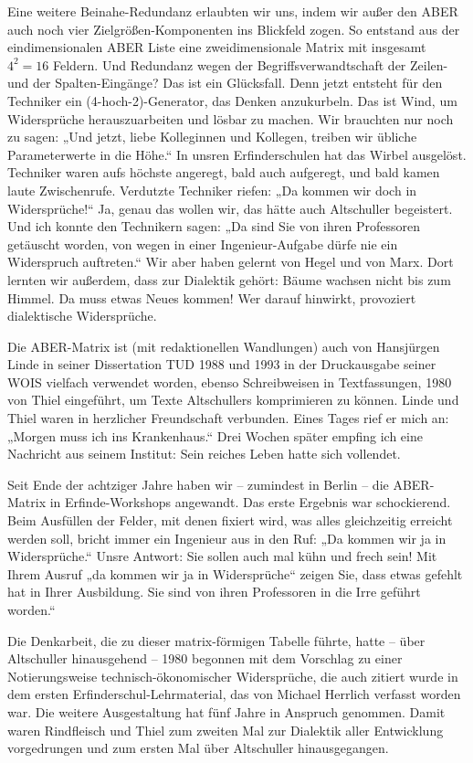 \documentclass[12pt,a4paper]{article}
\begin{document}
Eine weitere Beinahe-Redundanz erlaubten wir uns, indem wir außer den ABER auch
noch vier Zielgrößen-Komponenten ins Blickfeld zogen. So entstand aus der
eindimensionalen ABER Liste eine zweidimensionale Matrix mit insgesamt $4^2=16$
Feldern. Und Redundanz wegen der Begriffsverwandtschaft der Zeilen- und der
Spalten-Eingänge? Das ist ein Glücksfall. Denn jetzt entsteht für den Techniker
ein (4-hoch-2)-Generator, das Denken anzukurbeln. Das ist Wind, um Widersprüche
herauszuarbeiten und lösbar zu machen. Wir brauchten nur noch zu sagen: „Und
jetzt, liebe Kolleginnen und Kollegen, treiben wir übliche Parameterwerte in
die Höhe.“ In unsren Erfinderschulen hat das Wirbel ausgelöst. Techniker waren
aufs höchste angeregt, bald auch aufgeregt, und bald kamen laute Zwischenrufe.
Verdutzte Techniker riefen: „Da kommen wir doch in Widersprüche!“ Ja, genau das
wollen wir, das hätte auch Altschuller begeistert. Und ich konnte den
Technikern sagen: „Da sind Sie von ihren Professoren getäuscht worden, von
wegen in einer Ingenieur-Aufgabe dürfe nie ein Widerspruch auftreten.“ Wir aber
haben gelernt von Hegel und von Marx. Dort lernten wir außerdem, dass zur
Dialektik gehört: Bäume wachsen nicht bis zum Himmel. Da muss etwas Neues
kommen! Wer darauf hinwirkt, provoziert dialektische Widersprüche.

Die ABER-Matrix ist (mit redaktionellen Wandlungen) auch von Hansjürgen Linde
in seiner Dissertation TUD 1988 und 1993 in der Druckausgabe seiner WOIS
vielfach verwendet worden, ebenso Schreibweisen in Textfassungen, 1980 von
Thiel eingeführt, um Texte Altschullers komprimieren zu können. Linde und Thiel
waren in herzlicher Freundschaft verbunden. Eines Tages rief er mich an:
„Morgen muss ich ins Krankenhaus.“ Drei Wochen später empfing ich eine
Nachricht aus seinem Institut: Sein reiches Leben hatte sich vollendet.

Seit Ende der achtziger Jahre haben wir – zumindest in Berlin – die ABER-Matrix
in Erfinde-Workshops angewandt. Das erste Ergebnis war schockierend. Beim
Ausfüllen der Felder, mit denen fixiert wird, was alles gleichzeitig erreicht
werden soll, bricht immer ein Ingenieur aus in den Ruf: „Da kommen wir ja in
Widersprüche.“ Unsre Antwort: Sie sollen auch mal kühn und frech sein! Mit
Ihrem Ausruf „da kommen wir ja in Widersprüche“ zeigen Sie, dass etwas gefehlt
hat in Ihrer Ausbildung. Sie sind von ihren Professoren in die Irre geführt
worden.“

Die Denkarbeit, die zu dieser matrix-förmigen Tabelle führte, hatte – über
Altschuller hinausgehend -- 1980 begonnen mit dem Vorschlag zu einer
Notierungsweise technisch-ökonomischer Widersprüche, die auch zitiert wurde in
dem ersten Erfinderschul-Lehr\-material, das von Michael Herrlich verfasst
worden war. Die weitere Ausgestaltung hat fünf Jahre in Anspruch genommen.
Damit waren Rindfleisch und Thiel zum zweiten Mal zur Dialektik aller
Entwicklung vorgedrungen und zum ersten Mal über Altschuller hinausgegangen.
\end{document}

